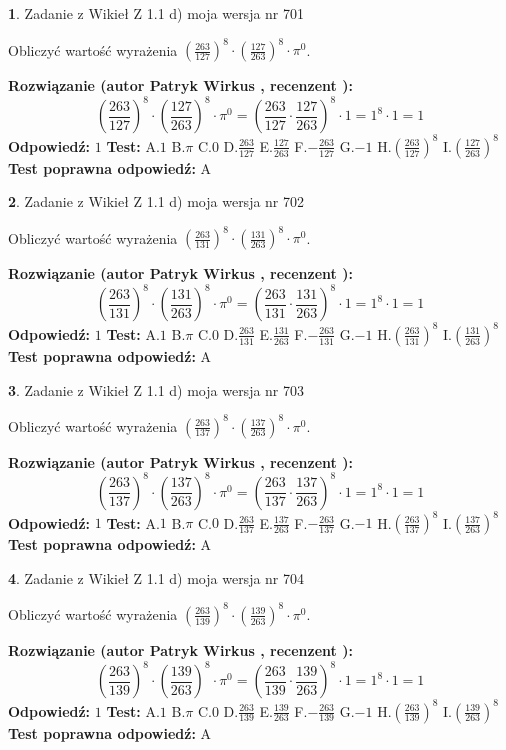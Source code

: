 \documentclass[12pt, a4paper]{article}
\theoremstyle{definition} %
\newtheorem{zad}{}
\newcommand{\zadStart}[1]{\begin{zad}#1\newline}
\newcommand{\zadStop}{\end{zad}}
\newcommand{\rozwStart}[2]{\noindent \textbf{Rozwiązanie (autor #1 , recenzent #2): }\newline}
\newcommand{\rozwStop}{\newline}
\newcommand{\odpStart}{\noindent \textbf{Odpowiedź:}\newline}
\newcommand{\odpStop}{\newline}
\newcommand{\testStart}{\noindent \textbf{Test:}\newline}
\newcommand{\testStop}{\newline}
\newcommand{\kluczStart}{\noindent \textbf{Test poprawna odpowiedź:}\newline}
\newcommand{\kluczStop}{\newline}
\begin{document}
\zadStart{Zadanie z Wikieł Z 1.1 d) moja wersja nr 701}

Obliczyć wartość wyrażenia $(\frac{263}{127})^{8} \cdot (\frac{127}{263})^{8} \cdot \pi^{0}$.
\zadStop
\rozwStart{Patryk Wirkus}{}
$$(\frac{263}{127})^{8} \cdot (\frac{127}{263})^{8} \cdot \pi^{0} = (\frac{263}{127} \cdot \frac{127}{263})^{8} \cdot 1 = 1^{8} \cdot 1 = 1$$
\rozwStop
\odpStart
$1$
\odpStop
\testStart
A.$1$ B.$\pi$ C.$0$ D.$\frac{263}{127}$ E.$\frac{127}{263}$
F.$-\frac{263}{127}$ G.$-1$
H.$(\frac{263}{127})^{8}$
I.$(\frac{127}{263})^{8}$
\testStop
\kluczStart
A
\kluczStop



\zadStart{Zadanie z Wikieł Z 1.1 d) moja wersja nr 702}

Obliczyć wartość wyrażenia $(\frac{263}{131})^{8} \cdot (\frac{131}{263})^{8} \cdot \pi^{0}$.
\zadStop
\rozwStart{Patryk Wirkus}{}
$$(\frac{263}{131})^{8} \cdot (\frac{131}{263})^{8} \cdot \pi^{0} = (\frac{263}{131} \cdot \frac{131}{263})^{8} \cdot 1 = 1^{8} \cdot 1 = 1$$
\rozwStop
\odpStart
$1$
\odpStop
\testStart
A.$1$ B.$\pi$ C.$0$ D.$\frac{263}{131}$ E.$\frac{131}{263}$
F.$-\frac{263}{131}$ G.$-1$
H.$(\frac{263}{131})^{8}$
I.$(\frac{131}{263})^{8}$
\testStop
\kluczStart
A
\kluczStop



\zadStart{Zadanie z Wikieł Z 1.1 d) moja wersja nr 703}

Obliczyć wartość wyrażenia $(\frac{263}{137})^{8} \cdot (\frac{137}{263})^{8} \cdot \pi^{0}$.
\zadStop
\rozwStart{Patryk Wirkus}{}
$$(\frac{263}{137})^{8} \cdot (\frac{137}{263})^{8} \cdot \pi^{0} = (\frac{263}{137} \cdot \frac{137}{263})^{8} \cdot 1 = 1^{8} \cdot 1 = 1$$
\rozwStop
\odpStart
$1$
\odpStop
\testStart
A.$1$ B.$\pi$ C.$0$ D.$\frac{263}{137}$ E.$\frac{137}{263}$
F.$-\frac{263}{137}$ G.$-1$
H.$(\frac{263}{137})^{8}$
I.$(\frac{137}{263})^{8}$
\testStop
\kluczStart
A
\kluczStop



\zadStart{Zadanie z Wikieł Z 1.1 d) moja wersja nr 704}

Obliczyć wartość wyrażenia $(\frac{263}{139})^{8} \cdot (\frac{139}{263})^{8} \cdot \pi^{0}$.
\zadStop
\rozwStart{Patryk Wirkus}{}
$$(\frac{263}{139})^{8} \cdot (\frac{139}{263})^{8} \cdot \pi^{0} = (\frac{263}{139} \cdot \frac{139}{263})^{8} \cdot 1 = 1^{8} \cdot 1 = 1$$
\rozwStop
\odpStart
$1$
\odpStop
\testStart
A.$1$ B.$\pi$ C.$0$ D.$\frac{263}{139}$ E.$\frac{139}{263}$
F.$-\frac{263}{139}$ G.$-1$
H.$(\frac{263}{139})^{8}$
I.$(\frac{139}{263})^{8}$
\testStop
\kluczStart
A
\kluczStop
\end{document}
